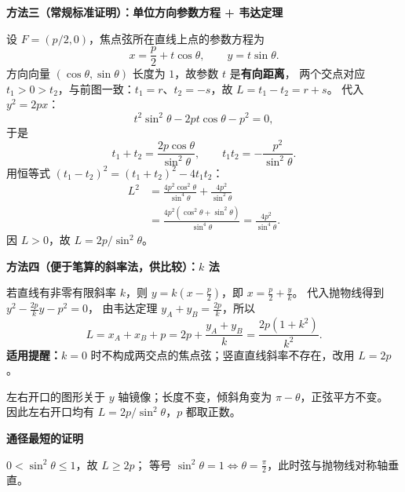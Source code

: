\clearpage
\begin{proofbox}
\textbf{\textcolor{CProof}{方法三（常规标准证明）：单位方向参数方程 + 韦达定理}}\par
设 $F=(p/2,0)$，焦点弦所在直线上点的参数方程为
\[
x=\frac p2+t\cos\theta,\qquad y=t\sin\theta.
\]
方向向量 $(\cos\theta,\sin\theta)$ 长度为 $1$，故参数 $t$ 是\textbf{有向距离}，
两个交点对应 $t_1>0>t_2$，与前图一致：$t_1=r$、$t_2=-s$，故 $L=t_1-t_2=r+s$。
代入 $y^2=2px$：
\[
t^2\sin^2\theta-2pt\cos\theta-p^2=0,
\]
于是
\[
t_1+t_2=\frac{2p\cos\theta}{\sin^2\theta},\qquad
t_1t_2=-\frac{p^2}{\sin^2\theta}.
\]
用恒等式 $(t_1-t_2)^2=(t_1+t_2)^2-4t_1t_2$：
\[
\begin{aligned}
L^2&=\frac{4p^2\cos^2\theta}{\sin^4\theta}
+\frac{4p^2}{\sin^2\theta}\\
&=\frac{4p^2(\cos^2\theta+\sin^2\theta)}{\sin^4\theta}
=\frac{4p^2}{\sin^4\theta}.
\end{aligned}
\]
因 $L>0$，故 $\boxed{L=2p/\sin^2\theta}$。
\end{proofbox}
\clearpage
\begin{proofbox}
\textbf{\textcolor{CProof}{方法四（便于笔算的斜率法，供比较）：$k$ 法}}\par
若直线有非零有限斜率 $k$，则
$y=k(x-\frac p2)$，即 $x=\frac p2+\frac yk$。
代入抛物线得到 $y^2-\frac{2p}{k}y-p^2=0$，
由韦达定理 $y_A+y_B=\frac{2p}k$，所以
\[
L=x_A+x_B+p
=2p+\frac{y_A+y_B}k
=\boxed{\frac{2p(1+k^2)}{k^2}}.
\]
\textbf{适用提醒：}$k=0$ 时不构成两交点的焦点弦；竖直直线斜率不存在，改用 $L=2p$。
\medskip
\begin{center}\end{center}
左右开口的图形关于 $y$ 轴镜像；长度不变，倾斜角变为 $\pi-\theta$，正弦平方不变。
因此左右开口均有 $L=2p/\sin^2\theta$，$p$ 都取正数。
\par\medskip
\textbf{\textcolor{CProof}{通径最短的证明}}\par
$0<\sin^2\theta\le1$，故 $L\ge2p$；
等号 $\sin^2\theta=1\iff \theta=\frac\pi2$，此时弦与抛物线对称轴垂直。
\end{proofbox}
